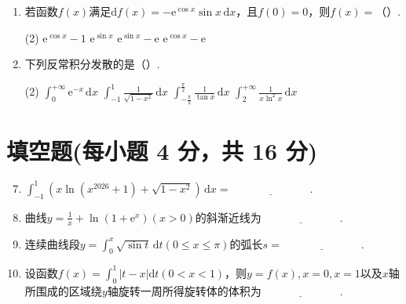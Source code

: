 \documentclass[../main.tex]{subfiles}
\begin{document}
\begin{enumerate}
          \begin{tasks}[label=\textbf{\Alph*.}, label-width=1.5em, column-sep=1em](2)
              \task $f''(x)$在$(a,b)$内严格单调递增
              \task $f''(c)=0$
              \task $f''(x)$在$(a,b)$内严格单调递减
              \task $f''(c)=0$且$f''(x)$在$(a,b)$内严格单调递减
          \end{tasks}

    \item 若函数$f(x)$满足$\mathrm{d}f(x)=-\mathrm{e}^{\cos x}\sin x\,\mathrm{d}x$，且$f
              (0)=0$，则$f(x)=$（\qquad）.

          \begin{tasks}[label=\textbf{\Alph*.}, label-width=1.5em, column-sep=1em](2)
              \task $\mathrm{e}^{\cos x}-1$
              \task $\mathrm{e}^{\sin x}$
              \task $\mathrm{e}^{\sin x}-\mathrm{e}$
              \task $\mathrm{e}^{\cos x}-\mathrm{e}$
          \end{tasks}

    \item 下列反常积分发散的是（\qquad）.

          \begin{tasks}[label=\textbf{\Alph*.}, label-width=1.5em, column-sep=1em](2)
              \task $\int_{0}^{+\infty}\mathrm{e}^{-x}\,\mathrm{d}x$
              \task $\int_{-1}^{1}\frac{1}{\sqrt{1-x^{2}}}\,\mathrm{d}x$
              \task $\int_{-\frac{\pi}{2}}^{\frac{\pi}{2}}\frac{1}{\tan x}\,\mathrm{d}x$
              \task $\int_{2}^{+\infty}\frac{1}{x\ln^{2} x}\,\mathrm{d}x$
          \end{tasks}
\end{enumerate}

\section{填空题(每小题 4 分，共 16 分)}
\begin{enumerate}
    \setcounter{enumi}{6}
    \item $\int_{-1}^{1}\left(x\ln\left(x^{2026}+1\right)+\sqrt{1-x^{2}}\right
              )\,\mathrm{d}x=\underline{\hspace{3cm}}$.
          \vspace{1em}

    \item 曲线$y=\frac{1}{x}+\ln\left(1+\mathrm{e}^{x}\right)(x>0)$的斜渐近线为$\underline
              {\hspace{3cm}}$.
          \vspace{1em}

    \item 连续曲线段$y=\int_{0}^{x}\sqrt{\sin t}\,\mathrm{d}t(0\leq x\leq \pi)$的弧长$s
              =\underline{\hspace{3cm}}$.
          \vspace{1em}

    \item 设函数$f(x)=\int_{0}^{1}|t-x|\mathrm{d}t(0<x<1)$，则$y=f(x),x=0,x=
              1$以及$x$轴所围成的区域绕$y$轴旋转一周所得旋转体的体积为$\underline{\hspace{3cm}
              }$.
\end{enumerate}
\end{document}
